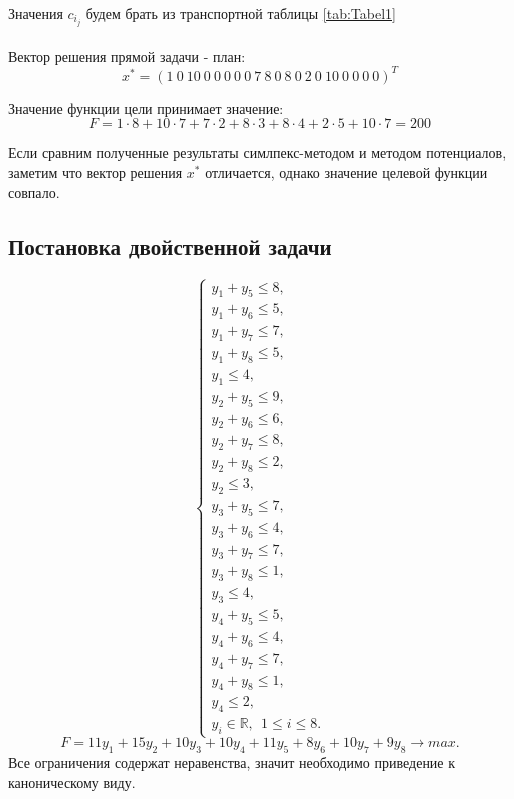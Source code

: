 \documentclass{article}
\begin{document}
\noindent Значения $c_i_j$ будем брать из транспортной таблицы \eqref{tab:Tabel1}
\\\\
Вектор решения прямой задачи - план:
$$x^{*} = (1~0~10~0~0~0~0~0~7~8~0~8~0~2~0~10~0~0~0~0)^T$$

\noindent Значение функции цели принимает значение:
$$F =1\cdot 8+10\cdot 7 + 7\cdot 2 + 8\cdot 3 + 8\cdot 4 + 2\cdot 5 + 10\cdot 7 = 200$$

\noindent Если сравним полученные результаты симлпекс-методом и методом потенциалов, заметим что вектор решения $x^{*}$ отличается, однако значение целевой функции совпало.

\subsection{Постановка двойственной задачи}
\begin{equation*}
    \begin{cases}
        \displaystyle y_1 + y_5 \leq 8,\\
        \displaystyle y_1 + y_6 \leq 5,\\
        \displaystyle y_1 + y_7 \leq 7,\\
        \displaystyle y_1 + y_8 \leq 5,\\
        \displaystyle y_1 \leq 4,\\
        \displaystyle y_2 + y_5 \leq 9,\\
        \displaystyle y_2 + y_6 \leq 6,\\
        \displaystyle y_2 + y_7 \leq 8,\\
        \displaystyle y_2 + y_8 \leq 2,\\
        \displaystyle y_2  \leq 3,\\
        \displaystyle y_3 + y_5 \leq 7,\\
        \displaystyle y_3 + y_6 \leq 4,\\
        \displaystyle y_3 + y_7 \leq 7,\\
        \displaystyle y_3 + y_8 \leq 1,\\
        \displaystyle y_3\leq 4,\\
        \displaystyle y_4 + y_5 \leq 5,\\
        \displaystyle y_4 + y_6 \leq 4,\\
        \displaystyle y_4 + y_7 \leq 7,\\
        \displaystyle y_4 + y_8 \leq 1,\\
        \displaystyle y_4\leq 2,\\
        \displaystyle y_{i}\in \mathbb{R},~~1\leq i \leq 8.
    \end{cases}
\end{equation*}
\begin{equation*}
F = 11y_1 + 15y_2 + 10y_3 + 10y_4 + 11y_5 + 8y_6 + 10y_7 + 9y_8\to max. 
\end{equation*}
Все ограничения содержат неравенства, значит необходимо приведение к каноническому виду.
\end{document}
